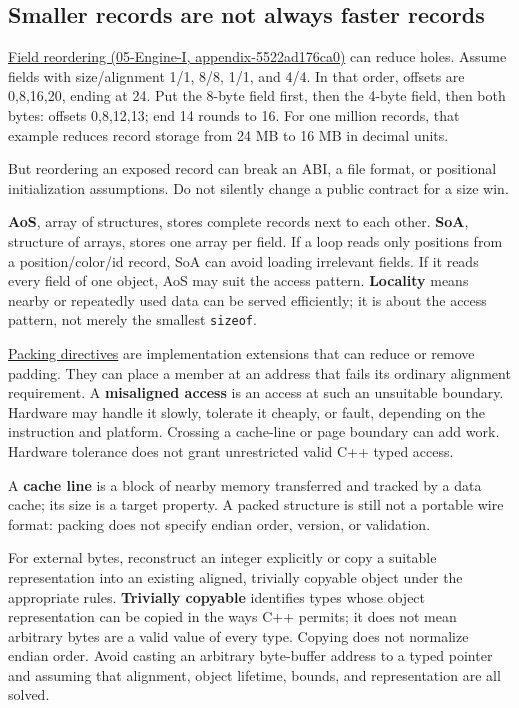 \subsection{Smaller records are not always faster records}\label{01-foundations-i-ch002-smaller-records-are-not-always-faster-records}

\href{../05-Engine-I/main.pdf\#nameddest=appendix-5522ad176ca0}{Field reordering (05-Engine-I, appendix-5522ad176ca0)} can reduce holes. Assume fields with size/alignment 1/1, 8/8, 1/1, and 4/4. In that order, offsets are 0,8,16,20, ending at 24. Put the 8-byte field first, then the 4-byte field, then both bytes: offsets 0,8,12,13; end 14 rounds to 16. For one million records, that example reduces record storage from 24 MB to 16 MB in decimal units.

But reordering an exposed record can break an ABI, a file format, or positional initialization assumptions. Do not silently change a public contract for a size win.

\textbf{AoS}, array of structures, stores complete records next to each other. \textbf{SoA}, structure of arrays, stores one array per field. If a loop reads only positions from a position/color/id record, SoA can avoid loading irrelevant fields. If it reads every field of one object, AoS may suit the access pattern. \textbf{Locality} means nearby or repeatedly used data can be served efficiently; it is about the access pattern, not merely the smallest \texttt{sizeof}.

\hyperref[appendix-0682dbfc5f0e]{Packing directives} are implementation extensions that can reduce or remove padding. They can place a member at an address that fails its ordinary alignment requirement. A \textbf{misaligned access} is an access at such an unsuitable boundary. Hardware may handle it slowly, tolerate it cheaply, or fault, depending on the instruction and platform. Crossing a cache-line or page boundary can add work. Hardware tolerance does not grant unrestricted valid C++ typed access.

A \textbf{cache line} is a block of nearby memory transferred and tracked by a data cache; its size is a target property. A packed structure is still not a portable wire format: packing does not specify endian order, version, or validation.

For external bytes, reconstruct an integer explicitly or copy a suitable representation into an existing aligned, trivially copyable object under the appropriate rules. \textbf{Trivially copyable} identifies types whose object representation can be copied in the ways C++ permits; it does not mean arbitrary bytes are a valid value of every type. Copying does not normalize endian order. Avoid casting an arbitrary byte-buffer address to a typed pointer and assuming that alignment, object lifetime, bounds, and representation are all solved.

